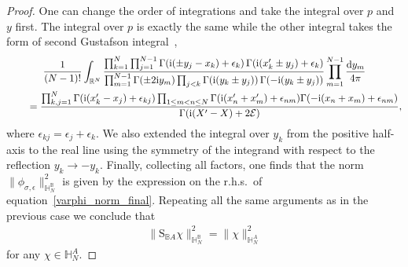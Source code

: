 \documentclass[pdftex]{sigma}%
\numberwithin{equation}{section}
\begin{document}
\begin{proof}
One can change the order of integrations and take the integral over $p$ and $y$ first. The integral over $p$ is exactly the same while the
other integral takes the form of second Gustafson integral~\cite[Theorem 9.3]{MR1139492},
\begin{gather*}
\frac1{(N-1)!}\int_{\mathbb R^N}\frac{\prod_{k=1}^N\prod_{j=1}^{N-1} \Gamma({\rm i}(\pm y_j- x_k)+\epsilon_k)\,\Gamma({\rm i}( x'_k\pm y_j)+\epsilon_k)}
{\prod_{m=1}^{N-1}\Gamma(\pm 2{\rm i} y_m) \prod_{j < k}\Gamma({\rm i}(y_k \pm y_j))\,\Gamma(-{\rm i}(y_k\pm y_j))}
\prod_{m=1}^{N-1} \frac{{\rm d}y_m}{4\pi}
\\ \qquad
{}=\frac{\prod_{k,j=1}^{N} \Gamma({\rm i}(x'_k-x_j)+\epsilon_{kj})\prod_{1\leq m<n\leq N}
\Gamma({\rm i}(x'_n+x'_m)+\epsilon_{nm}) \Gamma(-{\rm i}(x_n+x_m)+\epsilon_{nm})
 }{\Gamma({\rm i}(X'-X)+2\mathcal E)},
\end{gather*}
where $\epsilon_{kj}=\epsilon_j+\epsilon_k$.
We also extended the integral over $y_k$ from the positive half-axis to the real line using
the symmetry of the integrand with respect to the reflection $y_k\to -y_k$. Finally, collecting all factors, one finds that the norm
$\|\phi_{\sigma,\epsilon}\|^2_{\mathbb H_N^{\mathbb B}}$ is given by the expression on the r.h.s.\ of equation~\eqref{varphi_norm_final}.
Repeating all the same arguments as in the previous case we conclude that{\samepage
\begin{gather*}
\|\mathrm S_{\mathbb B A}\chi\|^2_{\mathbb H_N^{\mathbb B}}=\|\chi\|^2_{\mathbb H_{N}^A}
\end{gather*}
for any $\chi\in\mathbb H_{N}^A$.}



\end{proof}
\end{document}
